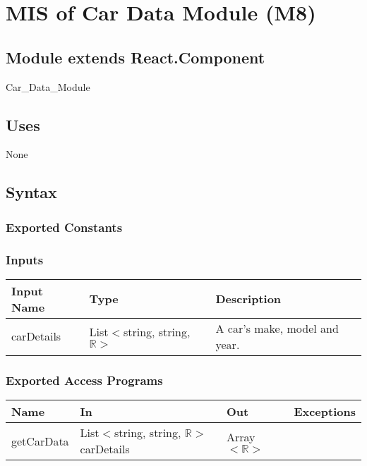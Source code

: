 \documentclass[12pt, titlepage]{article}
\begin{document}

\section{MIS of Car Data Module (M8)} 

\label{Module} 

\subsection{Module extends React.Component}

Car\_Data\_Module

\subsection{Uses}

None

\subsection{Syntax}

\subsubsection{Exported Constants}

\subsubsection{Inputs}
\begin{tabular}{| l | l | l |}
  \hline
  \textbf{Input Name} & \textbf{Type} & \textbf{Description}\\
  \hline
  carDetails & List$<$string, string, $\mathbb{R}>$  & A car's make, model and year. \\
  \hline
\end{tabular}

\subsubsection{Exported Access Programs}

\begin{tabular}{| l | l | l | l |}
  \hline
  \textbf{Name} & \textbf{In} & \textbf{Out} & \textbf{Exceptions}\\
  \hline
  getCarData & List$<$string, string, $\mathbb{R}>$ carDetails & Array$<\mathbb{R}>$ & ~\\
  \hline
\end{tabular}
\end{document}
